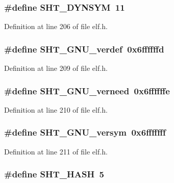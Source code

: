 \subsubsection[{SHT\_\-DYNSYM}]{\setlength{\rightskip}{0pt plus 5cm}\#define SHT\_\-DYNSYM~11}\label{elf_8h_a9949aedf49107f6a07e618d5d791d40}




Definition at line 206 of file elf.h.
\subsubsection[{SHT\_\-GNU\_\-verdef}]{\setlength{\rightskip}{0pt plus 5cm}\#define SHT\_\-GNU\_\-verdef~0x6ffffffd}\label{elf_8h_4fba652d51f945fbb25b1bb51149dc4a}




Definition at line 209 of file elf.h.
\subsubsection[{SHT\_\-GNU\_\-verneed}]{\setlength{\rightskip}{0pt plus 5cm}\#define SHT\_\-GNU\_\-verneed~0x6ffffffe}\label{elf_8h_959c7480e7b12fa0badf6960063364dd}




Definition at line 210 of file elf.h.
\subsubsection[{SHT\_\-GNU\_\-versym}]{\setlength{\rightskip}{0pt plus 5cm}\#define SHT\_\-GNU\_\-versym~0x6fffffff}\label{elf_8h_8cef21956c96f7dc48a9808e3207dd76}




Definition at line 211 of file elf.h.
\subsubsection[{SHT\_\-HASH}]{\setlength{\rightskip}{0pt plus 5cm}\#define SHT\_\-HASH~5}\label{elf_8h_446fd322326bea21373453c80c3f7925}




